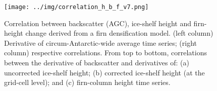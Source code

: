 \begin{figure}[!ht]
  \texttt{[image: ../img/correlation\_h\_b\_f\_v7.png]}
  \caption{
  Correlation between backscatter (AGC), ice-shelf height and firn-height change derived from a firn densification model. (left column) Derivative of circum-Antarctic-wide average time series; (right column) respective correlations. From top to bottom, correlations between the derivative of backscatter and derivatives of: (a) uncorrected ice-shelf height; (b) corrected ice-shelf height (at the grid-cell level); and (c) firn-column height time series.
  } 
  \label{c2f5}
\end{figure}


